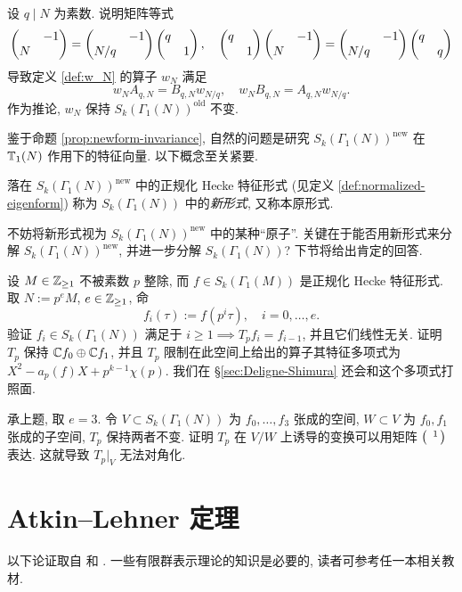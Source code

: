 \begin{exercise}\label{exo:wN-old}
	设 $q \mid N$ 为素数. 说明矩阵等式
	\[ \begin{pmatrix}  & -1 \\ N &  \end{pmatrix} = \begin{pmatrix}  & -1 \\ N/q &  \end{pmatrix} \begin{pmatrix} q &  \\  & 1 \end{pmatrix}, \quad \begin{pmatrix} q &  \\  & 1 \end{pmatrix} \begin{pmatrix}  & -1 \\ N &  \end{pmatrix} = \begin{pmatrix}  & -1 \\ N/q &  \end{pmatrix} \begin{pmatrix} q &  \\  & q \end{pmatrix} \]
	导致定义 \ref{def:w_N} 的算子 $w_N$ 满足
	\[ w_N A_{q, N} = B_{q, N} w_{N/q}, \quad w_N B_{q, N} = A_{q, N} w_{N/q}. \]
	作为推论, $w_N$ 保持 $S_k(\Gamma_1(N))^{\text{old}}$ 不变.
\end{exercise}

鉴于命题 \ref{prop:newform-invariance}, 自然的问题是研究 $S_k(\Gamma_1(N))^\text{new}$ 在 $\mathbb{T}_1(N)$ 作用下的特征向量. 以下概念至关紧要.

\begin{definition}[新形式]\label{def:newform} 
	落在 $S_k(\Gamma_1(N))^{\mathrm{new}}$ 中的正规化 Hecke 特征形式 (见定义 \ref{def:normalized-eigenform}) 称为 $S_k(\Gamma_1(N))$ 中的\emph{新形式}, 又称本原形式.
\end{definition}

不妨将新形式视为 $S_k(\Gamma_1(N))^{\mathrm{new}}$ 中的某种``原子''. 关键在于能否用新形式来分解 $S_k(\Gamma_1(N))^{\mathrm{new}}$, 并进一步分解 $S_k(\Gamma_1(N))$? 下节将给出肯定的回答.

\begin{exercise}
	设 $M \in \mathbb{Z}_{\geq 1}$ 不被素数 $p$ 整除, 而 $f \in S_k(\Gamma_1(M))$ 是正规化 Hecke 特征形式. 取 $N := p^e M$, $e \in \mathbb{Z}_{\geq 1}$, 命
	\[ f_i(\tau) := f(p^i \tau), \quad i = 0, \ldots, e. \]
	验证 $f_i \in S_k(\Gamma_1(N))$ 满足于 $i \geq 1 \implies T_p f_i = f_{i-1}$, 并且它们线性无关. 证明 $T_p$ 保持 $\mathbb{C} f_0 \oplus \mathbb{C} f_1$, 并且 $T_p$ 限制在此空间上给出的算子其特征多项式为 $X^2 - a_p(f) X + p^{k-1} \chi(p)$. 我们在 \S\ref{sec:Deligne-Shimura} 还会和这个多项式打照面.
\end{exercise}

\begin{exercise}\label{exo:non-semisimple-Tp}
	承上题, 取 $e = 3$. 令 $V \subset S_k(\Gamma_1(N))$ 为 $f_0, \ldots, f_3$ 张成的空间, $W \subset V$ 为 $f_0, f_1$ 张成的子空间, $T_p$ 保持两者不变. 证明 $T_p$ 在 $V/W$ 上诱导的变换可以用矩阵 $\bigl(\begin{smallmatrix}  & 1 \\  &  \end{smallmatrix}\bigr)$ 表达. 这就导致 $T_p|_V$ 无法对角化.
\end{exercise}

\section{Atkin--Lehner 定理}\label{sec:AT}
以下论证取自 \cite{Car99} 和 \cite[\S\S 5.6---5.7]{DS05}. 一些有限群表示理论的知识是必要的, 读者可参考任一本相关教材.

